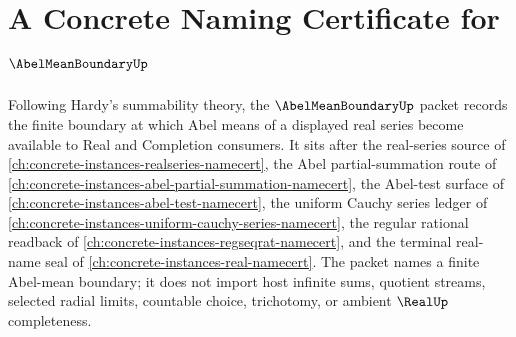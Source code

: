 \chapter{A Concrete Naming Certificate for $\AbelMeanBoundaryUp$}
\label{ch:concrete-instances-abel-mean-boundary-namecert}

Following Hardy's summability theory, the $\AbelMeanBoundaryUp$ packet records the finite boundary at which Abel means of a displayed real series become available to Real and Completion consumers. It sits after the real-series source of \autoref{ch:concrete-instances-realseries-namecert}, the Abel partial-summation route of \autoref{ch:concrete-instances-abel-partial-summation-namecert}, the Abel-test surface of \autoref{ch:concrete-instances-abel-test-namecert}, the uniform Cauchy series ledger of \autoref{ch:concrete-instances-uniform-cauchy-series-namecert}, the regular rational readback of \autoref{ch:concrete-instances-regseqrat-namecert}, and the terminal real-name seal of \autoref{ch:concrete-instances-real-namecert}. The packet names a finite Abel-mean boundary; it does not import host infinite sums, quotient streams, selected radial limits, countable choice, trichotomy, or ambient $\RealUp$ completeness.

